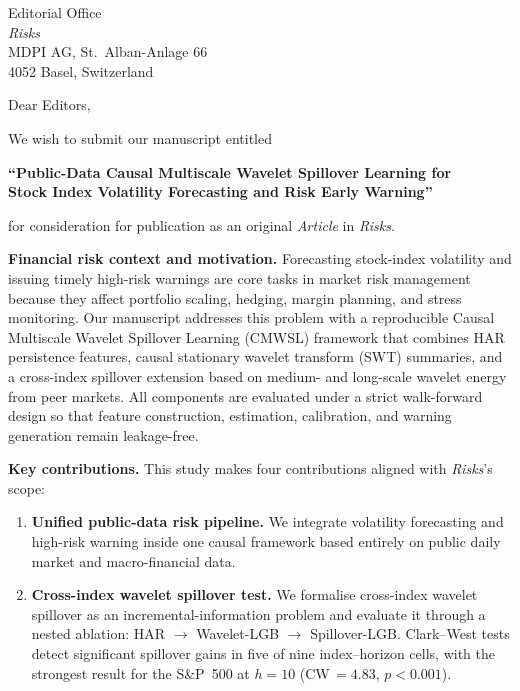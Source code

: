 \documentclass[11pt, a4paper]{letter}
\date{22 April 2026}
\begin{document}
\begin{letter}{%
  Editorial Office\\
  \textit{Risks}\\
  MDPI AG, St.\ Alban-Anlage 66\\
  4052 Basel, Switzerland
}

\opening{Dear Editors,}

We wish to submit our manuscript entitled

\begin{center}
  \textbf{``Public-Data Causal Multiscale Wavelet Spillover Learning for\\
  Stock Index Volatility Forecasting and Risk Early Warning''}
\end{center}

\noindent for consideration for publication as an original \textit{Article} in
\textit{Risks}.

\textbf{Financial risk context and motivation.}
Forecasting stock-index volatility and issuing timely high-risk warnings are
core tasks in market risk management because they affect portfolio scaling,
hedging, margin planning, and stress monitoring. Our manuscript addresses
this problem with a reproducible Causal Multiscale Wavelet Spillover
Learning (CMWSL) framework that combines HAR persistence features, causal
stationary wavelet transform (SWT) summaries, and a cross-index spillover
extension based on medium- and long-scale wavelet energy from peer
markets. All components are evaluated under a strict
walk-forward design so that feature construction, estimation, calibration,
and warning generation remain leakage-free.

\textbf{Key contributions.}
This study makes four contributions aligned with \textit{Risks}'s scope:
\begin{enumerate}

  \item \textbf{Unified public-data risk pipeline.}
    We integrate volatility forecasting and high-risk warning inside one
    causal framework based entirely on public daily market and
    macro-financial data.

  \item \textbf{Cross-index wavelet spillover test.}
    We formalise cross-index wavelet spillover as an incremental-information
    problem and evaluate it through a nested ablation:
    HAR $\rightarrow$ Wavelet-LGB $\rightarrow$ Spillover-LGB.
    Clark--West tests detect significant spillover gains in five of nine
    index--horizon cells, with the strongest result for the S\&P~500 at
    $h=10$ (CW\,$=4.83$, $p<0.001$).


\end{enumerate}
\end{letter}
\end{document}
